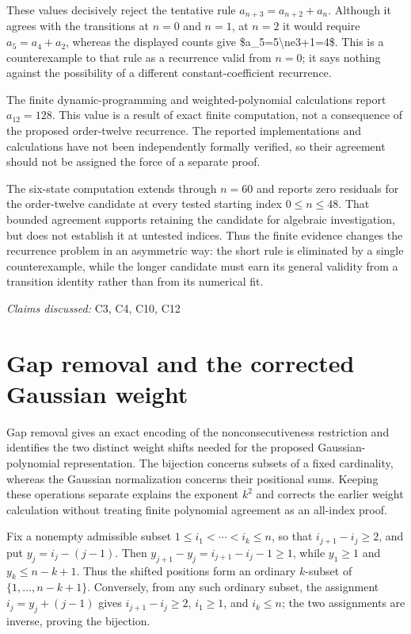 \documentclass[11pt]{article}
\begin{document}
These values decisively reject the tentative rule $a_{n+3}=a_{n+2}+a_n$. Although it agrees with the transitions at $n=0$ and $n=1$, at $n=2$ it would require $a_5=a_4+a_2$, whereas the displayed counts give \$a\_5=5\textbackslash{}ne3+1=4\$. This is a counterexample to that rule as a recurrence valid from $n=0$; it says nothing against the possibility of a different constant-coefficient recurrence.

The finite dynamic-programming and weighted-polynomial calculations report $a_{12}=128$. This value is a result of exact finite computation, not a consequence of the proposed order-twelve recurrence. The reported implementations and calculations have not been independently formally verified, so their agreement should not be assigned the force of a separate proof.

The six-state computation extends through $n=60$ and reports zero residuals for the order-twelve candidate at every tested starting index $0\leq n\leq48$. That bounded agreement supports retaining the candidate for algebraic investigation, but does not establish it at untested indices. Thus the finite evidence changes the recurrence problem in an asymmetric way: the short rule is eliminated by a single counterexample, while the longer candidate must earn its general validity from a transition identity rather than from its numerical fit.

\textit{Claims discussed: }C3, C4, C10, C12
\section{Gap removal and the corrected Gaussian weight}
Gap removal gives an exact encoding of the nonconsecutiveness restriction and identifies the two distinct weight shifts needed for the proposed Gaussian-polynomial representation. The bijection concerns subsets of a fixed cardinality, whereas the Gaussian normalization concerns their positional sums. Keeping these operations separate explains the exponent $k^2$ and corrects the earlier weight calculation without treating finite polynomial agreement as an all-index proof.

Fix a nonempty admissible subset $1\leq i_1<\cdots<i_k\leq n$, so that $i_{j+1}-i_j\geq2$, and put $y_j=i_j-(j-1)$. Then $y_{j+1}-y_j=i_{j+1}-i_j-1\geq1$, while $y_1\geq1$ and $y_k\leq n-k+1$. Thus the shifted positions form an ordinary $k$-subset of $\{1,\ldots,n-k+1\}$. Conversely, from any such ordinary subset, the assignment $i_j=y_j+(j-1)$ gives $i_{j+1}-i_j\geq2$, $i_1\geq1$, and $i_k\leq n$; the two assignments are inverse, proving the bijection.
\end{document}

